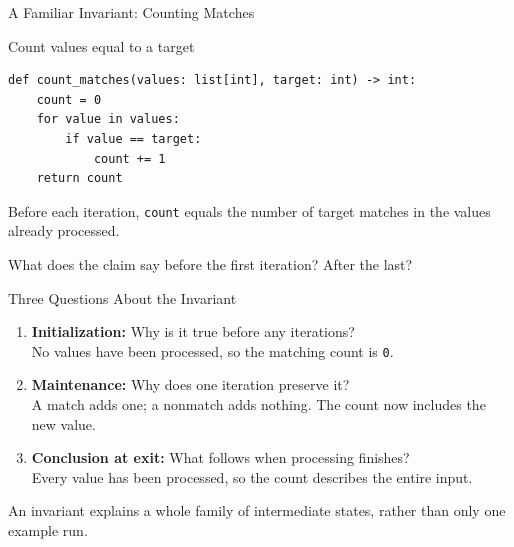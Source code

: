 \documentclass[aspectratio=169,10pt]{beamer}
\begin{document}
\begin{frame}[fragile]{A Familiar Invariant: Counting Matches}
\small
\begin{block}{Count values equal to a target}
\footnotesize
\begin{verbatim}
def count_matches(values: list[int], target: int) -> int:
    count = 0
    for value in values:
        if value == target:
            count += 1
    return count
\end{verbatim}
\end{block}
\begin{keyidea}Before each iteration, \texttt{count} equals the number of target matches in the values already processed.\end{keyidea}
\begin{activity}What does the claim say before the first iteration? After the last?\end{activity}
\end{frame}

\begin{frame}{Three Questions About the Invariant}
\small
\begin{enumerate}
 \item \textbf{Initialization:} Why is it true before any iterations?\\
 No values have been processed, so the matching count is \texttt{0}.
 \item \textbf{Maintenance:} Why does one iteration preserve it?\\
 A match adds one; a nonmatch adds nothing. The count now includes the new value.
 \item \textbf{Conclusion at exit:} What follows when processing finishes?\\
 Every value has been processed, so the count describes the entire input.
\end{enumerate}
\begin{keyidea}An invariant explains a whole family of intermediate states, rather than only one example run.\end{keyidea}
\end{frame}
\end{document}
